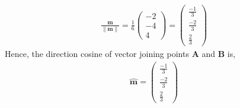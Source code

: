 \documentclass[12pt]{article}
\providecommand{\norm}[1]{\left\lVert#1\right\rVert}
\newcommand{\myvec}[1]{\ensuremath{\begin{pmatrix}#1\end{pmatrix}}}
\let\vec\mathbf
\begin{document}
\begin{enumerate}
\begin{align}
	\frac{\vec{m}}{\norm{\vec{m}}}=\frac{1}{6}{\myvec{-2\\-4\\4}}=\myvec{\frac{-1}{3}\\[4pt] \frac{-2}{3}\\[4pt] \frac{2}{3}}
\end{align}
Hence, the  direction cosine of vector joining points $\vec{A}$ and $\vec{B}$ is,
\begin{align}
\hat{\vec{m}}=\myvec{\frac{-1}{3}\\[4pt] \frac{-2}{3}\\[4pt] \frac{2}{3}}
\end{align}
\end{enumerate}
\end{document}
